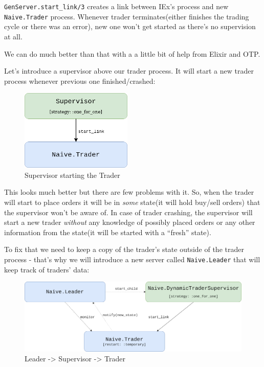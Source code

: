 \documentclass[
]{book}
\begin{document}
\texttt{GenServer.start\_link/3} creates a link between IEx's process and new \texttt{Naive.Trader} process. Whenever trader terminates(either finishes the trading cycle or there was an error), new one won't get started as there's no supervision at all.

We can do much better than that with a a little bit of help from Elixir and OTP.

Let's introduce a supervisor above our trader process. It will start a new trader process whenever previous one finished/crashed:

\begin{figure}
\centering
\includegraphics{images/chapter_05_02_supervise_the_trader.png}
\caption{Supervisor starting the Trader}
\end{figure}

This looks much better but there are few problems with it. So, when the trader will start to place orders it will be in \emph{some} state(it will hold buy/sell orders) that the supervisor won't be aware of. In case of trader crashing, the supervisor will start a new trader \emph{without} any knowledge of possibly placed orders or any other information from the state(it will be started with a ``fresh'' state).

To fix that we need to keep a copy of the trader's state outside of the trader process - that's why we will introduce a new server called \texttt{Naive.Leader} that will keep track of traders' data:

\begin{figure}
\centering
\includegraphics{images/chapter_05_03_leader_added.png}
\caption{Leader -\textgreater{} Supervisor -\textgreater{} Trader}
\end{figure}
\end{document}
